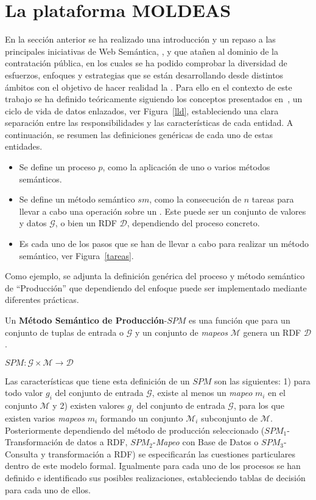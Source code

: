\documentclass[a4paper,final,11pt,fleqn,twoside]{book}  %
\begin{document}
\chapter{La plataforma MOLDEAS}
En la sección anterior se ha realizado una introducción y un repaso a las principales iniciativas 
de Web Semántica, \opendata, \linkeddata y \lod que atañen al dominio de la contratación pública, en los cuales se ha podido comprobar
la diversidad de esfuerzos, enfoques y estrategias que se están desarrollando desde distintos ámbitos 
con el objetivo de hacer realidad la \wod. Para ello en el contexto de este trabajo se ha definido 
teóricamente siguiendo los conceptos presentados en~\cite{RDF,citeulike:1556975,RDFS,owl2-primer,SparqlSemantics}, 
un ciclo de vida de datos enlazados, ver Figura~\ref{lld}, estableciendo una clara separación entre las responsibilidades y 
las características de  cada entidad. A continuación, se resumen las definiciones genéricas de cada uno de estas entidades.
\begin{itemize}
 \item Se define un proceso $p$, como la aplicación de uno o varios métodos semánticos. 
 \item Se define un método semántico $sm$, como la consecución de $n$ tareas para llevar a cabo
una operación sobre un \dataset.  Este \dataset puede ser un conjunto de valores y datos $\mathcal{G}$, o bien
un \dataset RDF $\mathcal{D}$, dependiendo del proceso concreto.
\item  Es cada uno de los pasos que se han de llevar a cabo para realizar un método semántico, ver Figura~\ref{tareas}.
\end{itemize}
Como ejemplo, se adjunta la definición genérica del proceso y método semántico de ``Producción'' que dependiendo 
del enfoque puede ser implementado mediante diferentes prácticas.

Un \textbf{Método Semántico de Producción}-$SPM$ es una función que para un conjunto de tuplas de entrada o \dataset $\mathcal{G}$ y un conjunto de \textit{mapeos} $\mathcal{M}$  
genera un \dataset RDF $\mathcal{D}$.

\begin{center}
    $SPM : \mathcal{G} \times \mathcal{M} \longrightarrow \mathcal{D}$
\end{center}

Las características que tiene esta definición de un $SPM$ son las siguientes: 1) para todo valor $g_{i}$ del conjunto de 
entrada $\mathcal{G}$, existe al menos un \textit{mapeo} $m_{i}$ en el conjunto $\mathcal{M}$ y  2) existen valores $g_{i}$ del conjunto de entrada $\mathcal{G}$, para los que existen varios \textit{mapeos} $m_{i}$ 
formando un conjunto $\mathcal{M}_{i}$ subconjunto de $\mathcal{M}$. Posteriormente dependiendo del método de 
producción seleccionado ($SPM_1$-Transformación de datos a RDF, $SPM_2$-\textit{Mapeo} con Base de Datos o $SPM_3$-Consulta y transformación a RDF) 
se especificarán las cuestiones particulares dentro de este modelo formal. Igualmente para cada uno de los procesos se han definido 
e identificado sus posibles realizaciones, estableciendo tablas de decisión para cada uno de ellos.
\end{document}

